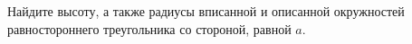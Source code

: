 \begin{ex}
	\begin{condition}
		Найдите высоту, а также радиусы вписанной и описанной окружностей равностороннего треугольника со стороной, равной \( a \).
	\end{condition}
\end{ex}